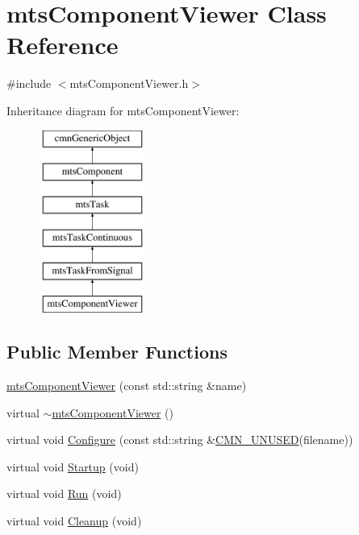 \hypertarget{classmts_component_viewer}{\section{mts\-Component\-Viewer Class Reference}
\label{classmts_component_viewer}
}


{\ttfamily \#include $<$mts\-Component\-Viewer.\-h$>$}

Inheritance diagram for mts\-Component\-Viewer\-:\begin{figure}[H]
\begin{center}
\leavevmode
\includegraphics[height=6.000000cm]{d0/d6a/classmts_component_viewer}
\end{center}
\end{figure}
\subsection*{Public Member Functions}
\begin{DoxyCompactItemize}
\item 
\hyperlink{classmts_component_viewer_a0b50fd33fa1fcad2b06ad69cfa5450cb}{mts\-Component\-Viewer} (const std\-::string \&name)
\item 
virtual \hyperlink{classmts_component_viewer_a6bc182a4d81ab4c55b9a9ed7a2b50666}{$\sim$mts\-Component\-Viewer} ()
\item 
virtual void \hyperlink{classmts_component_viewer_af3c34464ddff5a8b5728fb414543a144}{Configure} (const std\-::string \&\hyperlink{cmn_portability_8h_a021894e2626935fa2305434b1e893ff6}{C\-M\-N\-\_\-\-U\-N\-U\-S\-E\-D}(filename))
\item 
virtual void \hyperlink{classmts_component_viewer_a425bc56d337aca711e8834126939762a}{Startup} (void)
\item 
virtual void \hyperlink{classmts_component_viewer_a4c3d8d11e6e2f187c1b8fdaef3b3c561}{Run} (void)
\item 
virtual void \hyperlink{classmts_component_viewer_aff0098569266c8804e07377551f627f9}{Cleanup} (void)
\end{DoxyCompactItemize}
